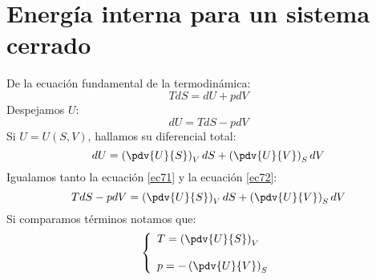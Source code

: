 \documentclass[../main]{subfiles}
\begin{document}
\section{Energía interna para un sistema cerrado}
De la ecuación fundamental de la termodinámica:
\begin{equation}
    TdS=dU+pdV
\end{equation}
Despejamos $U$:
\begin{equation}
    dU=TdS-pdV
    \label{ec71}
\end{equation}
Si $U=U(S,V)$, hallamos su diferencial total:
\begin{equation}
    dU=\left( \pdv{U}{S}\right)_V dS+\left( \pdv{U}{V}\right)_S dV
    \label{ec72}
\end{equation}
Igualamos tanto la ecuación \eqref{ec71} y la ecuación \eqref{ec72}:
\begin{equation}
    TdS-pdV=\left( \pdv{U}{S}\right)_V dS+\left( \pdv{U}{V}\right)_S dV
\end{equation}
Si comparamos términos notamos que:
\begin{equation}
    \left\{
    \begin{array}{l}
        T=\left(\displaystyle \pdv{U}{S}\right)_V \\ \\
        p=-\left(\displaystyle \pdv{U}{V}\right)_S
    \end{array}
    \right.
\end{equation}
\end{document}
